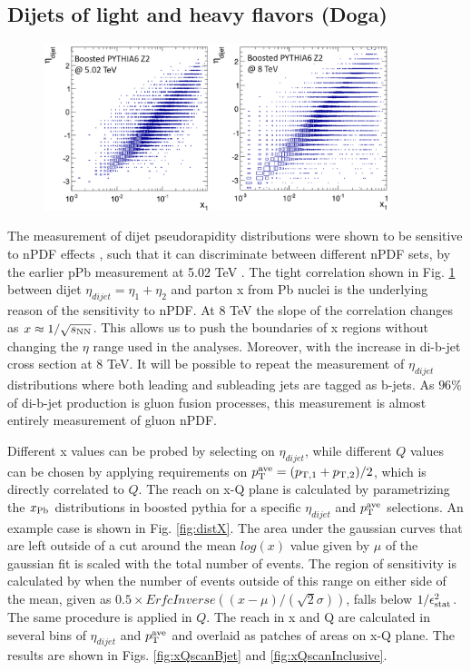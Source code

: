 \subsection{Dijets of light and heavy flavors (Doga)}


\begin{figure}[h]
\begin{center}
\includegraphics[width= 0.9\textwidth]{figures/x_vs_eta.png}
\caption{}
\label{fig:dijetCorr}
\end{center}
\end{figure}

The measurement of dijet pseudorapidity distributions were shown to be sensitive to nPDF effects \cite{}, such that it can discriminate between different nPDF sets, by the earlier pPb measurement at 5.02 TeV \cite{}. The tight correlation shown in Fig. \ref{fig:dijetCorr} between dijet $\eta_{dijet} = \eta_{1} + \eta_{2}$ and parton x from Pb nuclei is the underlying reason of the sensitivity to nPDF. At 8 TeV the slope of the correlation changes as $x \approx 1/\sqrt{s_{\rm NN}}$. This allows us to push the boundaries of x regions without changing the $\eta$ range used in the analyses. Moreover, with the increase in di-b-jet cross section at 8 TeV. It will be possible to repeat the measurement of $\eta_{dijet}$ distributions where both leading and subleading jets are tagged as b-jets. As $96\%$ of di-b-jet production is gluon fusion processes, this measurement is almost entirely measurement of gluon nPDF.


Different x values can be probed by selecting on $\eta_{dijet}$, while different $Q$ values can be chosen by applying requirements on $p_\mathrm{T}^{\rm ave} = (p_{\rm T,1} + p_{\rm T,2})/2$, which is directly correlated to $Q$. The reach on x-Q plane is calculated by parametrizing the $x_{\rm Pb}$ distributions in boosted {\sc pythia} for a specific $\eta_{dijet}$ and $p_\mathrm{T}^{\rm ave}$ selections. An example case is shown in Fig. \ref{fig:distX}. The area under the gaussian curves that are left outside of a cut around the mean $log(x)$ value given by $\mu$ of the gaussian fit is scaled with the total number of events. The region of sensitivity is calculated by when the number of events outside of this range on either side of the mean, given as $0.5 \times ErfcInverse((x-\mu)/(\sqrt{2}\sigma))$, falls below $1/\epsilon_{\rm stat}^{2}$. The same procedure is applied in $Q$. The reach in x and Q are calculated in several bins of $\eta_{dijet}$ and $p_\mathrm{T}^{\rm ave}$ and overlaid as patches of areas on x-Q plane. The results are shown in Figs. \ref{fig:xQscanBjet} and \ref{fig:xQscanInclusive}.

